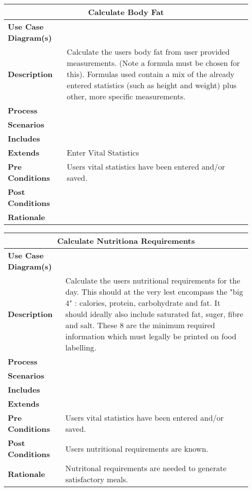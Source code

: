 \documentclass[12pt]{article}
\begin{document}
\begin{center}
\begin{tabularx}{\textwidth}{ |X|X|}
\hline
\multicolumn{2}{|c|}{\textbf{Calculate Body Fat}}\\
\hline
\hline
\textbf{Use Case Diagram(s)} & \\ \hline
\textbf{Description} & Calculate the users body fat from user provided measurements. (Note a formula must be chosen for this). Formulas used contain a mix of the already entered statistics (such as height and weight) plus other, more specific measurements.\\ \hline
\textbf{Process} & \\ \hline
\textbf{Scenarios} & \\ \hline
\textbf{Includes} & \\ \hline
\textbf{Extends} & Enter Vital Statistics \\ \hline
\textbf{Pre Conditions} & Users vital statistics have been entered and/or saved.\\ \hline
\textbf{Post Conditions} & \\ \hline
\textbf{Rationale} & \\ \hline
\end{tabularx}
\end{center}


\begin{center}
\begin{tabularx}{\textwidth}{ |X|X|}
\hline
\multicolumn{2}{|c|}{\textbf{Calculate Nutritiona Requirements}}\\
\hline
\hline
\textbf{Use Case Diagram(s)} & \\ \hline
\textbf{Description} & Calculate the users nutritional requirements for the day. This should at the very lest encompass the "big 4" : calories, protein, carbohydrate and fat. It should ideally also include saturated fat, suger, fibre and salt. These 8 are the minimum required information which must legally be printed on food labelling.\\ \hline
\textbf{Process} & \\ \hline
\textbf{Scenarios} & \\ \hline
\textbf{Includes} & \\ \hline
\textbf{Extends} &  \\ \hline
\textbf{Pre Conditions} & Users vital statistics have been entered and/or saved.\\ \hline
\textbf{Post Conditions} & Users nutritional requirements are known.\\ \hline
\textbf{Rationale} & Nutritonal requirements are needed to generate satisfactory meals.\\ \hline
\end{tabularx}
\end{center}
\end{document}
